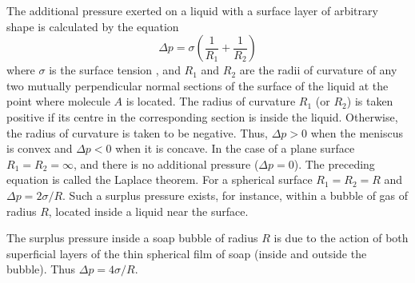 The additional pressure exerted on a liquid with a surface layer of arbitrary shape is calculated by the equation 
\begin{equation*}%
\Delta p = \sigma \left(\frac{1}{R_{1}} + \frac{1}{R_{2}}  \right)
\end{equation*}
where $\sigma$ is the surface tension , and $R_{1}$ and $R_{2}$ are the radii of curvature of any two mutually perpendicular normal sections of the surface of the liquid at the point where molecule $A$ is located. The radius of curvature $R_{1}$ (or $R_{2}$) is taken positive if its centre in the corresponding section is inside the liquid. Otherwise, the radius of curvature is taken to be negative. Thus, $\Delta p > 0$ when the meniscus is convex and $\Delta p < 0$ when it is concave. In the case of a plane surface $R_{1} = R_{2} = \infty$, and there is no additional pressure ($\Delta p = 0$). The preceding equation is called the Laplace theorem. For a spherical surface $R_{1} = R_{2 }= R$ and $\Delta p = 2\sigma/R$. Such a surplus pressure exists, for instance, within a bubble of gas of radius $R$, located inside a liquid near the surface.

The surplus pressure inside a soap bubble of radius $R$ is due to the action of both superficial layers of the thin spherical film of soap (inside and outside the bubble). Thus $\Delta p = 4\sigma/R$. 

